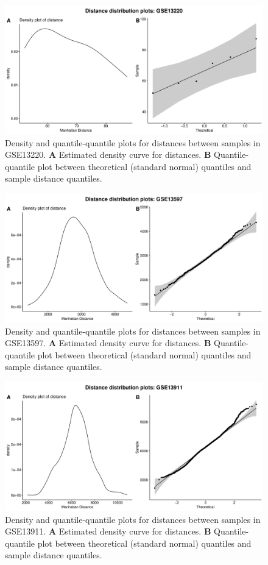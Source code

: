 \documentclass[10pt,letterpaper]{article}\usepackage[]{graphicx}\usepackage[]{color}
\begin{document}
\begin{figure}[H]
	\includegraphics[width=\textwidth]{manhattan-distance_hist_GSE13220.pdf}
	\caption{Density and quantile-quantile plots for distances between samples in GSE13220. \textbf{A} Estimated density curve for distances. \textbf{B} Quantile-quantile plot between theoretical (standard normal) quantiles and sample distance quantiles.}
\end{figure}

\begin{figure}[H]
	\includegraphics[width=\textwidth]{manhattan-distance_hist_GSE13597.pdf}
	\caption{Density and quantile-quantile plots for distances between samples in GSE13597. \textbf{A} Estimated density curve for distances. \textbf{B} Quantile-quantile plot between theoretical (standard normal) quantiles and sample distance quantiles.}
\end{figure}

\begin{figure}[H]
	\includegraphics[width=\textwidth]{manhattan-distance_hist_GSE13911.pdf}
	\caption{Density and quantile-quantile plots for distances between samples in GSE13911. \textbf{A} Estimated density curve for distances. \textbf{B} Quantile-quantile plot between theoretical (standard normal) quantiles and sample distance quantiles.}
\end{figure}
\end{document}
